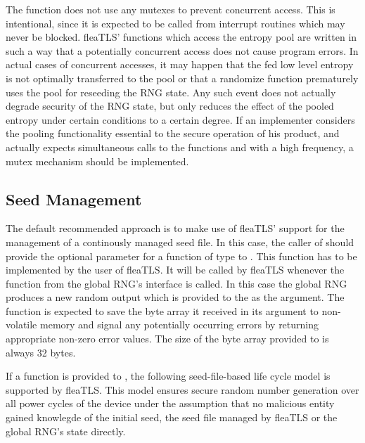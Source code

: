 \documentclass[a4paper,11pt]{scrartcl}
\begin{document}
The function  does not
use any mutexes to prevent concurrent access. This is intentional, since it is
expected to be called from interrupt routines which may never be blocked.
fleaTLS' functions which access the
entropy pool are written in such a way that a potentially concurrent access does
not cause program errors. In actual cases of concurrent accesses, it may happen that
the fed low level entropy is not optimally transferred to the pool or that a
randomize function prematurely uses the pool for reseeding the RNG state. Any
such event does not actually degrade security of the RNG state, but only reduces the effect of
the pooled entropy under certain conditions to a certain degree. If an
implementer considers the pooling functionality essential to the secure
operation of his product, and actually expects simultaneous calls to the functions
 and
 with a high frequency, a mutex mechanism should be implemented.

\subsection{Seed Management}
\label{secSeedFile}
The default recommended approach is to make use of fleaTLS' support for
the management of a continously managed seed file. In this case, the caller
of \funcLibInit should provide the optional parameter for a function of type
 to \funcLibInit. This function has to be implemented
by the user of fleaTLS. It will be called by
fleaTLS whenever the function  from
the global RNG's interface is called. In this case the global RNG produces a new
random output which is provided to the  as the
argument. The function is expected to save the byte array it received in its
argument to non-volatile memory and signal any potentially occurring errors by
returning appropriate non-zero error values. The size of the byte array provided
to \funcSaveRngState is always 32 bytes.

If a \funcSaveRngState function is provided to \funcLibInit, the following seed-file-based life cycle model
is supported by fleaTLS. This model ensures secure random number generation over
all power cycles of the device under the
assumption that no malicious entity gained knowlegde of the initial seed, the
seed file managed by fleaTLS or the global RNG's state directly.
\end{document}
